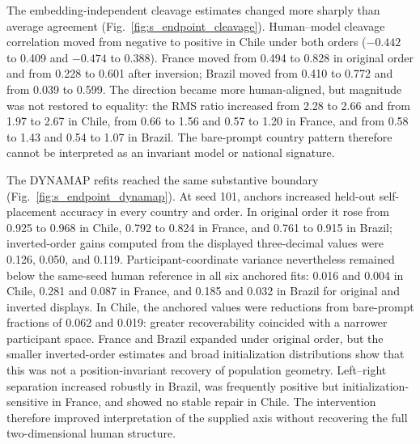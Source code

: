 \documentclass[unnumsec,webpdf,modern,large]{oup-authoring-template}
\begin{document}
\begin{table}[p]
\caption{Endpoint-anchor diagnostic for Qwen3-32B at $T=0$. Changed and $\Delta$ agreement compare anchored with bare responses within the same participant--decision cells. Cleavage is Pearson correlation between adult human and model Bradley--Terry right-minus-left proposal utilities. Self-pl. accuracy and participant variance use the primary DYNAMAP initialization (seed 101); variance is normalized to the same-seed national human fit. Original and inverted displays are reported separately because the anchor effect remained position-dependent.}
\label{tab:s_endpoint_anchor}
\centering
\scriptsize
\resizebox{\textwidth}{!}{}
\end{table}

The embedding-independent cleavage estimates changed more sharply than average agreement (Fig.~\ref{fig:s_endpoint_cleavage}). Human--model cleavage correlation moved from negative to positive in Chile under both orders ($-0.442$ to 0.409 and $-0.474$ to 0.388). France moved from 0.494 to 0.828 in original order and from 0.228 to 0.601 after inversion; Brazil moved from 0.410 to 0.772 and from 0.039 to 0.599. The direction became more human-aligned, but magnitude was not restored to equality: the RMS ratio increased from 2.28 to 2.66 and from 1.97 to 2.67 in Chile, from 0.66 to 1.56 and 0.57 to 1.20 in France, and from 0.58 to 1.43 and 0.54 to 1.07 in Brazil. The bare-prompt country pattern therefore cannot be interpreted as an invariant model or national signature.

The DYNAMAP refits reached the same substantive boundary (Fig.~\ref{fig:s_endpoint_dynamap}). At seed 101, anchors increased held-out self-placement accuracy in every country and order. In original order it rose from 0.925 to 0.968 in Chile, 0.792 to 0.824 in France, and 0.761 to 0.915 in Brazil; inverted-order gains computed from the displayed three-decimal values were 0.126, 0.050, and 0.119. Participant-coordinate variance nevertheless remained below the same-seed human reference in all six anchored fits: 0.016 and 0.004 in Chile, 0.281 and 0.087 in France, and 0.185 and 0.032 in Brazil for original and inverted displays. In Chile, the anchored values were reductions from bare-prompt fractions of 0.062 and 0.019: greater recoverability coincided with a narrower participant space. France and Brazil expanded under original order, but the smaller inverted-order estimates and broad initialization distributions show that this was not a position-invariant recovery of population geometry. Left--right separation increased robustly in Brazil, was frequently positive but initialization-sensitive in France, and showed no stable repair in Chile. The intervention therefore improved interpretation of the supplied axis without recovering the full two-dimensional human structure.
\end{document}
